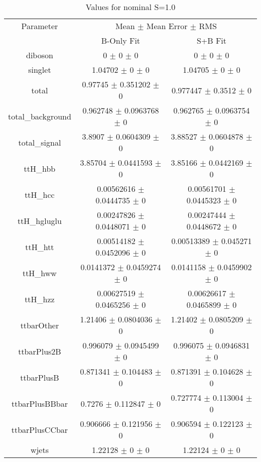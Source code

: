 \begin{table}
\centering
\caption{Values for nominal S=1.0}
\begin{tabular}{ccc}
\toprule
Parameter & \multicolumn{2}{c}{Mean $\pm$ Mean Error $\pm$ RMS}\\
 & B-Only Fit & S+B Fit\\
\midrule
diboson & \num{0} $\pm$ \num{0} $\pm$ \num{0} & \num{0} $\pm$ \num{0} $\pm$ \num{0}\\
singlet & \num{1.04702} $\pm$ \num{0} $\pm$ \num{0} & \num{1.04705} $\pm$ \num{0} $\pm$ \num{0}\\
total & \num{0.97745} $\pm$ \num{0.351202} $\pm$ \num{0} & \num{0.977447} $\pm$ \num{0.3512} $\pm$ \num{0}\\
total\_background & \num{0.962748} $\pm$ \num{0.0963768} $\pm$ \num{0} & \num{0.962765} $\pm$ \num{0.0963754} $\pm$ \num{0}\\
total\_signal & \num{3.8907} $\pm$ \num{0.0604309} $\pm$ \num{0} & \num{3.88527} $\pm$ \num{0.0604878} $\pm$ \num{0}\\
ttH\_hbb & \num{3.85704} $\pm$ \num{0.0441593} $\pm$ \num{0} & \num{3.85166} $\pm$ \num{0.0442169} $\pm$ \num{0}\\
ttH\_hcc & \num{0.00562616} $\pm$ \num{0.0444735} $\pm$ \num{0} & \num{0.00561701} $\pm$ \num{0.0445323} $\pm$ \num{0}\\
ttH\_hgluglu & \num{0.00247826} $\pm$ \num{0.0448071} $\pm$ \num{0} & \num{0.00247444} $\pm$ \num{0.0448672} $\pm$ \num{0}\\
ttH\_htt & \num{0.00514182} $\pm$ \num{0.0452096} $\pm$ \num{0} & \num{0.00513389} $\pm$ \num{0.045271} $\pm$ \num{0}\\
ttH\_hww & \num{0.0141372} $\pm$ \num{0.0459274} $\pm$ \num{0} & \num{0.0141158} $\pm$ \num{0.0459902} $\pm$ \num{0}\\
ttH\_hzz & \num{0.00627519} $\pm$ \num{0.0465256} $\pm$ \num{0} & \num{0.00626617} $\pm$ \num{0.0465899} $\pm$ \num{0}\\
ttbarOther & \num{1.21406} $\pm$ \num{0.0804036} $\pm$ \num{0} & \num{1.21402} $\pm$ \num{0.0805209} $\pm$ \num{0}\\
ttbarPlus2B & \num{0.996079} $\pm$ \num{0.0945499} $\pm$ \num{0} & \num{0.996075} $\pm$ \num{0.0946831} $\pm$ \num{0}\\
ttbarPlusB & \num{0.871341} $\pm$ \num{0.104483} $\pm$ \num{0} & \num{0.871391} $\pm$ \num{0.104628} $\pm$ \num{0}\\
ttbarPlusBBbar & \num{0.7276} $\pm$ \num{0.112847} $\pm$ \num{0} & \num{0.727774} $\pm$ \num{0.113004} $\pm$ \num{0}\\
ttbarPlusCCbar & \num{0.906666} $\pm$ \num{0.121956} $\pm$ \num{0} & \num{0.906594} $\pm$ \num{0.122123} $\pm$ \num{0}\\
wjets & \num{1.22128} $\pm$ \num{0} $\pm$ \num{0} & \num{1.22124} $\pm$ \num{0} $\pm$ \num{0}\\
\bottomrule
\end{tabular}
\end{table}